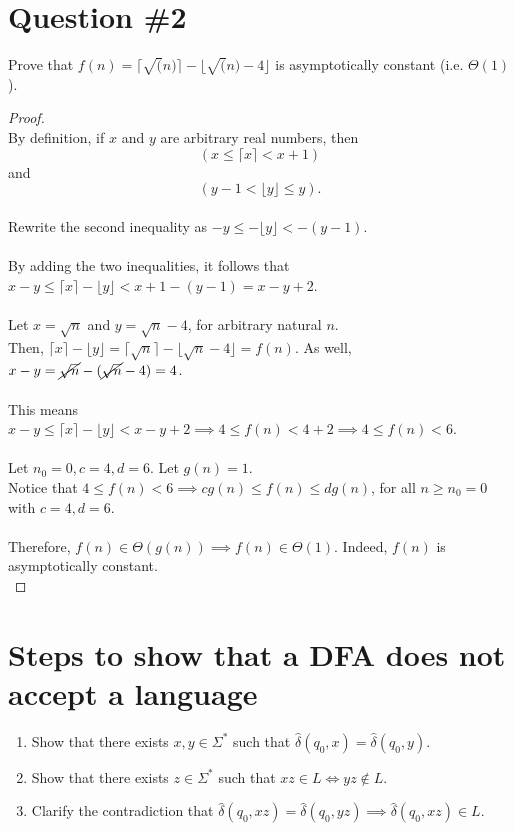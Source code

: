 \documentclass[12pt]{article}
\begin{document}
\section*{Question \#2}
Prove that \( f(n) = \lceil \sqrt(n) \rceil - \lfloor \sqrt(n) - 4 \rfloor\) is asymptotically constant (i.e. \( \Theta(1)\)).
\begin{proof}
\leavevmode\\
    By definition, if \(x\) and \(y\) are arbitrary real numbers, then \[ (x \leq \lceil x \rceil < x + 1) \] and \[ (y - 1 < \lfloor y \rfloor \leq y) \text{.} \] \\
    Rewrite the second inequality as \( -y \leq - \lfloor y \rfloor < - (y - 1) \). \\
    \\
    By adding the two inequalities, it follows that \( x - y \leq \lceil x \rceil - \lfloor y \rfloor < x + 1 - (y - 1) = x - y + 2 \). \\
    \\
    Let \( x = \sqrt{n} \) and \( y = \sqrt{n} - 4 \), for arbitrary natural \( n \). \\
    Then, \( \lceil x \rceil - \lfloor y \rfloor = \lceil \sqrt{n} \rceil - \lfloor \sqrt{n} - 4 \rfloor = f(n) \). As well, \( x - y = \cancel{\sqrt{n}} - (\cancel{\sqrt{n}} - 4) = 4 \). \\
    \\
    This means \( x - y \leq \lceil x \rceil - \lfloor y \rfloor < x - y + 2 \implies 4 \leq f(n) < 4 + 2 \implies 4 \leq f(n) < 6 \). \\
    \\
    Let \( n_0 = 0, c = 4, d = 6 \). Let \( g(n) = 1 \). \\
    Notice that \( 4 \leq f(n) < 6 \implies cg(n) \leq f(n) \leq dg(n) \), for all \( n \geq n_0 = 0 \) with \( c = 4, d = 6 \). \\
    \\
    Therefore, \( f(n) \in \Theta(g(n)) \implies f(n) \in \Theta(1) \). Indeed, \( f(n) \) is asymptotically constant. \\
\end{proof}
\pagebreak

\section*{Steps to show that a DFA does not accept a language}
\begin{enumerate}
    \item Show that there exists \( x, y \in \Sigma ^* \) such that \( \hat{\delta}(q_0, x) = \hat{\delta}(q_0, y) \).
    \item Show that there exists \( z \in \Sigma^* \) such that \( xz \in L \iff yz \notin L \).
    \item Clarify the contradiction that \( \hat{\delta}(q_0, xz) = \hat{\delta}(q_0, yz) \implies \hat{\delta}(q_0, xz) \in L \).
\end{enumerate}
\pagebreak
\end{document}
